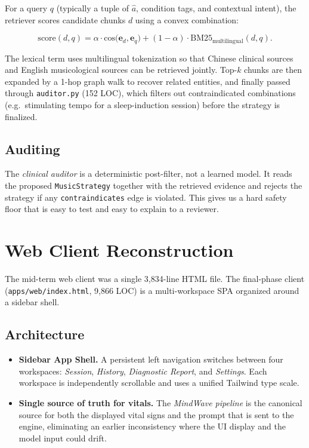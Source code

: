 \documentclass[11pt,a4paper]{article}
\begin{document}
For a query $q$ (typically a tuple of $\hat a$, condition tags, and contextual
intent), the retriever scores candidate chunks $d$ using a convex combination:

\[
  \mathrm{score}(d, q) = \alpha \cdot \mathrm{cos}\bigl(\mathbf{e}_d, \mathbf{e}_q\bigr)
                      + (1-\alpha) \cdot \mathrm{BM25}_{\text{multilingual}}(d, q).
\]

The lexical term uses multilingual tokenization so that Chinese clinical
sources and English musicological sources can be retrieved jointly. Top-$k$
chunks are then expanded by a 1-hop graph walk to recover related entities,
and finally passed through \texttt{auditor.py} (152 LOC), which filters out
contraindicated combinations (e.g.\ stimulating tempo for a sleep-induction
session) before the strategy is finalized.

\subsection{Auditing}

The \emph{clinical auditor} is a deterministic post-filter, not a learned
model. It reads the proposed \texttt{MusicStrategy} together with the retrieved
evidence and rejects the strategy if any \texttt{contraindicates} edge is
violated. This gives us a hard safety floor that is easy to test and easy to
explain to a reviewer.

\section{Web Client Reconstruction}

The mid-term web client was a single 3{,}834-line HTML file. The final-phase
client (\texttt{apps/web/index.html}, 9{,}866 LOC) is a multi-workspace SPA
organized around a sidebar shell.

\subsection{Architecture}

\begin{itemize}[leftmargin=*]
  \item \textbf{Sidebar App Shell.} A persistent left navigation switches
    between four workspaces: \emph{Session}, \emph{History}, \emph{Diagnostic
    Report}, and \emph{Settings}. Each workspace is independently scrollable
    and uses a unified Tailwind type scale.
  \item \textbf{Single source of truth for vitals.} The \emph{MindWave
    pipeline} is the canonical source for both the displayed vital signs and
    the prompt that is sent to the engine, eliminating an earlier
    inconsistency where the UI display and the model input could drift.
\end{itemize}
\end{document}
